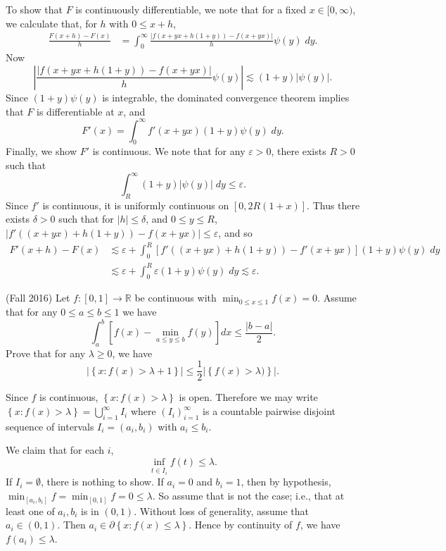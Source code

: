 \documentclass{exam}
\theoremstyle{problemstyle}
\newcommand{\1}[1]{\textbf{1}_{\left[#1\right]}} %
\def\R{\mathbb{R}} %
\begin{document}
\begin{questions}
\begin{solution}
    To show that $F$ is continuously differentiable, we note that for a fixed $x \in [0,\infty)$, we calculate that, for $h$ with $0 \leq x + h$,
    \begin{align*}
        \frac{F(x+h) - F(x)}{h} &= \int_0^\infty \frac{|f(x+yx + h(1 + y)) - f(x + yx)|}{h} \psi(y)\; dy.
    \end{align*}
    Now
    \[ \left| \frac{|f(x+yx + h(1 + y)) - f(x + yx)|}{h} \psi(y) \right| \lesssim (1 + y) |\psi(y)|. \]
    Since $(1 + y) \psi(y)$ is integrable, the dominated convergence theorem implies that $F$ is differentiable at $x$, and
    \[ F'(x) = \int_0^\infty f'(x + yx) (1 + y) \psi(y)\; dy. \]
    Finally, we show $F'$ is continuous. We note that for any $\varepsilon > 0$, there exists $R > 0$ such that
    \[ \int_R^\infty (1 + y) |\psi(y)|\; dy \leq \varepsilon. \]
    Since $f'$ is continuous, it is uniformly continuous on $[0,2R(1 + x)]$. Thus there exists $\delta > 0$ such that for $|h| \leq \delta$, and $0 \leq y \leq R$, $|f'((x + yx) + h(1 + y)) - f(x + yx)| \leq \varepsilon$, and so
    \begin{align*}
        F'(x+h) - F(x) &\lesssim \varepsilon + \int_0^R [f'((x + yx) + h(1 + y)) - f'(x + yx)] (1 + y) \psi(y)\; dy\\
        &\lesssim \varepsilon + \int_0^R \varepsilon (1 + y) \psi(y)\; dy \lesssim \varepsilon.
    \end{align*}
\end{solution}

\question (Fall 2016) Let $f:[0,1]\to \R$ be continuous with $\min_{0\leq x\leq 1} f(x) = 0$. Assume that for any $0\leq a\leq b\leq 1$ we have
%
\[ \int_{a}^{b}[f(x)-\min_{a\leq y\leq b}f(y)]dx \leq \frac{|b-a|}{2}. \]
%
Prove that for any $\lambda\geq 0$, we have
\begin{equation*}
\left| \left\{ x:f(x)>\lambda+1 \right\} \right|\leq \frac{1}{2} \left| \left\{ f(x)>\lambda) \right\} \right|.
\end{equation*}

\begin{solution}
  Since $f$ is continuous, $\left\{x: f(x)>\lambda \right\}$ is open. Therefore we may write $\left\{x: f(x)>\lambda \right\} = \bigcup_{i=1}^{\infty}I_{i}$ where $(I_{i})_{i=1}^{\infty}$ is a countable pairwise disjoint sequence of intervals $I_{i}=(a_{i},b_{i})$ with $a_{i}\leq b_{i}$.

  We claim that for each $i$,
  \[ \inf_{t \in \overline{I}_i} f(t) \leq \lambda. \]
  If $I_i = \emptyset$, there is nothing to show. If $a_i = 0$ and $b_i = 1$, then by hypothesis, $\min_{[a_{i},b_{i}]}f =\min_{[0,1]}f = 0\leq \lambda$. So assume that is not the case; i.e., that at least one of $a_{i},b_{i}$ is in $(0,1)$. Without loss of generality, assume that $a_i \in (0,1)$. Then $a_i \in \partial \left\{ x: f(x)\leq \lambda \right\}$. Hence by continuity of $f$, we have $f(a_{i})\leq \lambda$.


\end{solution}
\end{questions}
\end{document}
